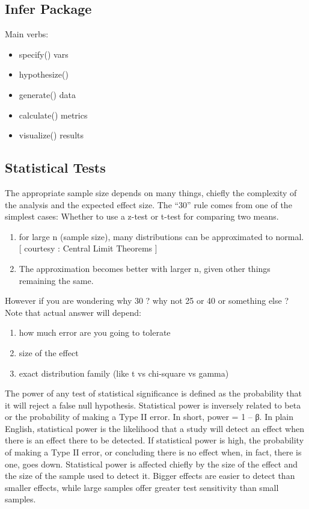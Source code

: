 \documentclass[]{book}
\theoremstyle{definition}
\theoremstyle{definition}
\theoremstyle{definition}
\theoremstyle{remark}
\begin{document}
\subsection{Infer Package}\label{infer-package}

Main verbs:

\begin{itemize}
\item
  specify() vars
\item
  hypothesize()
\item
  generate() data
\item
  calculate() metrics
\item
  visualize() results
\end{itemize}

\subsection{Statistical Tests}\label{statistical-tests}

The appropriate sample size depends on many things, chiefly the
complexity of the analysis and the expected effect size. The ``30'' rule
comes from one of the simplest cases: Whether to use a z-test or t-test
for comparing two means.

\begin{enumerate}
\def\labelenumi{\arabic{enumi})}
\item
  for large n (sample size), many distributions can be approximated to
  normal. {[} courtesy : Central Limit Theorems {]}
\item
  The approximation becomes better with larger n, given other things
  remaining the same.
\end{enumerate}

However if you are wondering why 30 ? why not 25 or 40 or something else
? Note that actual answer will depend:

\begin{enumerate}
\def\labelenumi{\arabic{enumi})}
\item
  how much error are you going to tolerate
\item
  size of the effect
\item
  exact distribution family (like t vs chi-square vs gamma)
\end{enumerate}

The power of any test of statistical significance is defined as the
probability that it will reject a false null hypothesis. Statistical
power is inversely related to beta or the probability of making a Type
II error. In short, power = 1 -- β. In plain English, statistical power
is the likelihood that a study will detect an effect when there is an
effect there to be detected. If statistical power is high, the
probability of making a Type II error, or concluding there is no effect
when, in fact, there is one, goes down. Statistical power is affected
chiefly by the size of the effect and the size of the sample used to
detect it. Bigger effects are easier to detect than smaller effects,
while large samples offer greater test sensitivity than small samples.
\end{document}
